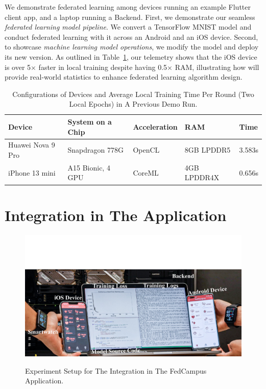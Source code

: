 We demonstrate federated learning among
devices running an example Flutter client app,
and a laptop running a \fedkit Backend.
First, we demonstrate our seamless \textit{federated learning model pipeline}.
We convert a TensorFlow MNIST model and
conduct federated learning with it across an Android and an iOS device.
Second, to showcase \textit{machine learning model operations},
we modify the model and deploy its new version.
As outlined in Table~\ref{tbl:demo-stats},
our telemetry shows that
the iOS device is over 5$\times$ faster in local training despite
having 0.5$\times$ RAM,
illustrating how \fedkit will provide real-world statistics to
enhance federated learning algorithm design.

\begin{table}\begin{center}
        \begin{tabular}{lllll}\toprule
            Device            & System on a Chip  & Acceleration & RAM         & Time   \\\midrule
            Huawei Nova 9 Pro & Snapdragon 778G   & OpenCL       & 8GB LPDDR5  & 3.583s \\
            iPhone 13 mini    & A15 Bionic, 4 GPU & CoreML       & 4GB LPDDR4X & 0.656s \\\bottomrule
        \end{tabular}
        \caption{Configurations of Devices and Average Local Training Time Per Round
            (Two Local Epochs) in A Previous Demo Run.
        }
        \label{tbl:demo-stats}
    \end{center}\end{table}

\section{\fedkit Integration in The \fedcampus Application}

\begin{figure}\begin{center}
        \label{fig:integration}
        \includegraphics[width=\linewidth]{fedcampus.pdf}
        \caption{Experiment Setup for The \fedkit Integration in The FedCampus
            Application.
        }
    \end{center}\end{figure}

